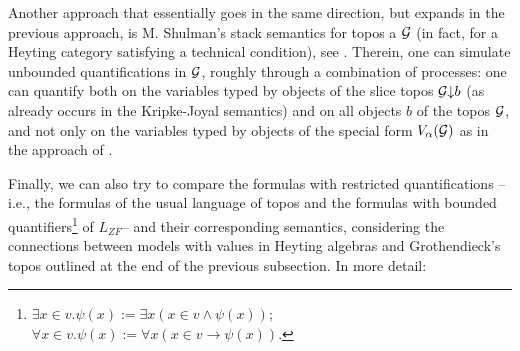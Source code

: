 \documentclass[10pt,longbibliography]{article}
\begin{document}


Another approach that essentially goes in the same direction, but expands in the previous approach, is M. Shulman's stack semantics for topos a ${\cal G}$ (in fact, for a Heyting category satisfying a technical condition), see \cite{Shulman10}. Therein, one can simulate unbounded quantifications in ${\cal G}$, roughly through a combination of processes: one can quantify both on the variables typed by objects of the slice topos ${\cal G}{\downarrow} b$ (as already occurs in the Kripke-Joyal semantics) and on all objects $b$ of the topos $\cal G$, and not only on the variables typed by objects of the special form $V_\alpha(\cal G)$ as in the approach of \cite{Fourman80, Hayashi81}.



Finally, we can also try to compare the formulas with restricted quantifications --i.e., the formulas of the usual language of topos and the formulas with bounded quantifiers\footnote{$\exists x \in v . \psi(x) := \exists x (x \in v \wedge \psi(x))$; $\forall x \in v . \psi(x) := \forall x (x \in v \to \psi(x))$.} of $L_{ZF}$-- and their corresponding semantics, considering the connections between models with values in Heyting algebras and Grothendieck's topos outlined at the end of the previous subsection. In more detail:
\end{document}
